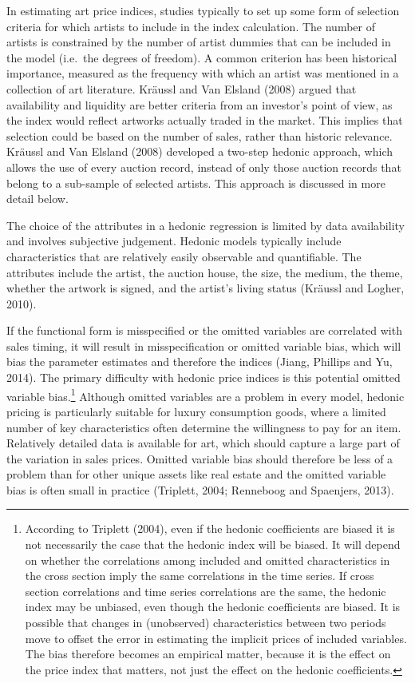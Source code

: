 \documentclass[12pt,]{article}
\let\rmarkdownfootnote\footnote%
\def\footnote{\protect\rmarkdownfootnote}
\begin{document}
In estimating art price indices, studies typically to set up some form
of selection criteria for which artists to include in the index
calculation. The number of artists is constrained by the number of
artist dummies that can be included in the model (i.e.~the degrees of
freedom). A common criterion has been historical importance, measured as
the frequency with which an artist was mentioned in a collection of art
literature. Kräussl and Van Elsland (2008) argued that availability and
liquidity are better criteria from an investor's point of view, as the
index would reflect artworks actually traded in the market. This implies
that selection could be based on the number of sales, rather than
historic relevance. Kräussl and Van Elsland (2008) developed a two-step
hedonic approach, which allows the use of every auction record, instead
of only those auction records that belong to a sub-sample of selected
artists. This approach is discussed in more detail below.

The choice of the attributes in a hedonic regression is limited by data
availability and involves subjective judgement. Hedonic models typically
include characteristics that are relatively easily observable and
quantifiable. The attributes include the artist, the auction house, the
size, the medium, the theme, whether the artwork is signed, and the
artist's living status (Kräussl and Logher, 2010).

If the functional form is misspecified or the omitted variables are
correlated with sales timing, it will result in misspecification or
omitted variable bias, which will bias the parameter estimates and
therefore the indices (Jiang, Phillips and Yu, 2014). The primary
difficulty with hedonic price indices is this potential omitted variable
bias.\footnote{According to Triplett (2004), even if the hedonic
  coefficients are biased it is not necessarily the case that the
  hedonic index will be biased. It will depend on whether the
  correlations among included and omitted characteristics in the cross
  section imply the same correlations in the time series. If cross
  section correlations and time series correlations are the same, the
  hedonic index may be unbiased, even though the hedonic coefficients
  are biased. It is possible that changes in (unobserved)
  characteristics between two periods move to offset the error in
  estimating the implicit prices of included variables. The bias
  therefore becomes an empirical matter, because it is the effect on the
  price index that matters, not just the effect on the hedonic
  coefficients.} Although omitted variables are a problem in every
model, hedonic pricing is particularly suitable for luxury consumption
goods, where a limited number of key characteristics often determine the
willingness to pay for an item. Relatively detailed data is available
for art, which should capture a large part of the variation in sales
prices. Omitted variable bias should therefore be less of a problem than
for other unique assets like real estate and the omitted variable bias
is often small in practice (Triplett, 2004; Renneboog and Spaenjers,
2013).
\end{document}
